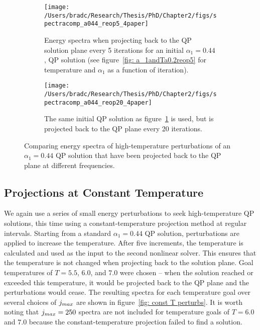 \documentclass[../PhD.tex]{subfiles}
\begin{document}
\begin{figure}[H]
	\centering
	\begin{subfigure}[t]{0.47\textwidth}
		\texttt{[image: /Users/bradc/Research/Thesis/PhD/Chapter2/figs/spectracomp\_a044\_reop5\_4paper]}
		\caption{Energy spectra when projecting back to the QP solution plane every 5 iterations for an initial ${\alpha_1 = 0.44}$, QP solution (see figure~\ref{fig: a_1andTa0.2reop5} for temperature and $\alpha_1$ as a function of iteration).}
		\label{fig: spec comparisons reop5}
	\end{subfigure}
	\hfill
	\begin{subfigure}[t]{0.47\textwidth}
		\texttt{[image: /Users/bradc/Research/Thesis/PhD/Chapter2/figs/spectracomp\_a044\_reop20\_4paper]}
		\caption{The same initial QP solution as figure~\ref{fig: spec comparisons reop5} is used, but is projected back to the QP plane every 20 iterations.}
		\label{fig: spec comparisons reop20}
	\end{subfigure}
	\caption[Energy spectra resulting from perturbing the same QP solution at differing frequencies]{Comparing energy spectra of high-temperature perturbations of an $\alpha_1=0.44$ QP solution that have been projected back to the QP plane at different frequencies.}
	\label{fig: spec comps with reop}
\end{figure}



\subsection{Projections at Constant Temperature}
\label{ssec: T projections}

We again use a series of small energy perturbations to seek high-temperature QP solutions, this time using a constant-temperature projection method at regular intervals. Starting from a standard $\alpha_1 = 0.44$ QP solution, perturbations are applied to increase the temperature. After five increments, the temperature is calculated and used as the input to the second nonlinear solver. This ensures that the temperature is not changed when projecting back to the solution plane. Goal temperatures of $T=5.5$, $6.0$, and $7.0$ were chosen -- when the solution reached or exceeded this temperature, it would be projected back to the QP plane and the perturbations would cease. The resulting spectra for each temperature goal over several choices of $j_{max}$ are shown in figure~\ref{fig: const T perturbs}. It is worth noting that $j_{max} = 250$ spectra are not included for temperature goals of $T=6.0$ and $7.0$ because the constant-temperature projection failed to find a solution.
\end{document}
